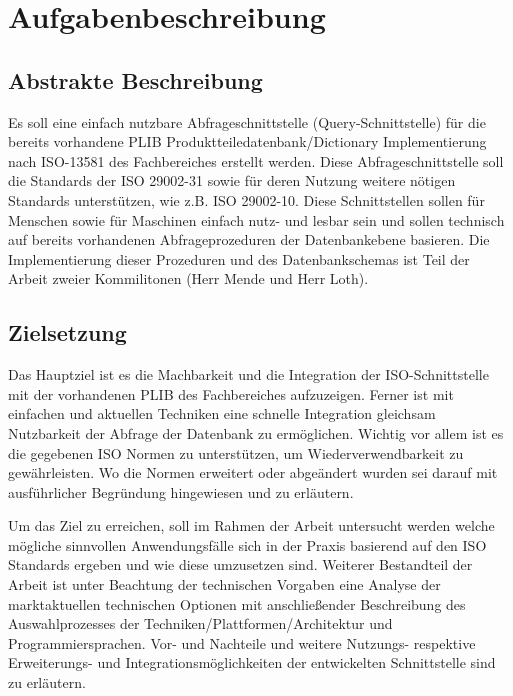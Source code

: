 \chapter{Aufgabenbeschreibung} \label{Aufgabenbeschreibung}

\section{Abstrakte Beschreibung}

Es soll eine einfach nutzbare Abfrageschnittstelle (Query-Schnittstelle) für die bereits vorhandene PLIB Produktteiledatenbank/Dictionary Implementierung nach ISO-13581 des Fachbereiches erstellt werden. Diese Abfrageschnittstelle soll die Standards der ISO 29002-31 sowie für deren Nutzung weitere nötigen Standards unterstützen, wie z.B. ISO 29002-10. Diese Schnittstellen sollen für Menschen sowie für Maschinen einfach nutz- und lesbar sein und sollen technisch auf bereits vorhandenen Abfrageprozeduren der Datenbankebene basieren. Die Implementierung dieser Prozeduren und des Datenbankschemas ist Teil der Arbeit zweier Kommilitonen (Herr Mende und Herr Loth).

\section{Zielsetzung}
Das Hauptziel ist es die Machbarkeit und die Integration der ISO-Schnittstelle mit der vorhandenen PLIB des Fachbereiches aufzuzeigen. 
Ferner ist mit einfachen und aktuellen Techniken eine schnelle Integration gleichsam Nutzbarkeit der Abfrage der Datenbank zu ermöglichen. Wichtig vor allem ist es die gegebenen ISO Normen zu unterstützen, um Wiederverwendbarkeit zu gewährleisten. Wo die Normen erweitert oder abgeändert wurden sei darauf mit ausführlicher Begründung hingewiesen und zu erläutern. 

Um das Ziel zu erreichen, soll im Rahmen der Arbeit untersucht werden welche mögliche sinnvollen Anwendungsfälle sich in der Praxis basierend auf den ISO Standards ergeben und wie diese umzusetzen sind. Weiterer Bestandteil der Arbeit ist unter Beachtung der technischen Vorgaben eine Analyse der marktaktuellen technischen Optionen mit anschließender Beschreibung des Auswahlprozesses der Techniken/Plattformen/Architektur und Programmiersprachen. Vor- und Nachteile und weitere Nutzungs- respektive Erweiterungs- und Integrationsmöglichkeiten der entwickelten Schnittstelle sind zu erläutern. 

